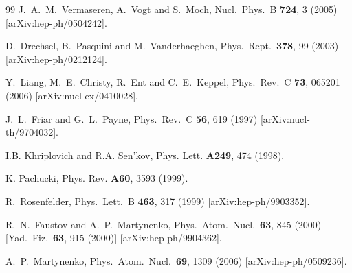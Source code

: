 \documentclass[a4paper,12pt]{article}
\begin{document}
\begin{thebibliography}{99}
  J.~A.~M.~Vermaseren, A.~Vogt and S.~Moch,
  Nucl.\ Phys.\  B {\bf 724}, 3 (2005)
  [arXiv:hep-ph/0504242].

  D.~Drechsel, B.~Pasquini and M.~Vanderhaeghen,
  Phys.\ Rept.\  {\bf 378}, 99 (2003)
  [arXiv:hep-ph/0212124].
  
  Y.~Liang, M.~E.~Christy, R.~Ent and C.~E.~Keppel,
  Phys.\ Rev.\  C {\bf 73}, 065201 (2006)
  [arXiv:nucl-ex/0410028].
  
J.~L.~Friar and G.~L.~Payne,
Phys.\ Rev.\ C {\bf 56}, 619 (1997)
[arXiv:nucl-th/9704032].

 I.B. Khriplovich and R.A. Sen'kov, Phys. Lett. {\bf A249}, 474 (1998). 

 K. Pachucki, Phys. Rev. {\bf A60}, 3593 (1999).

  R.~Rosenfelder,
  Phys.\ Lett.\  B {\bf 463}, 317 (1999)
  [arXiv:hep-ph/9903352].

  R.~N.~Faustov and A.~P.~Martynenko,
  Phys.\ Atom.\ Nucl.\  {\bf 63}, 845 (2000)
  [Yad.\ Fiz.\  {\bf 63}, 915 (2000)]
  [arXiv:hep-ph/9904362].


  A.~P.~Martynenko,
  Phys.\ Atom.\ Nucl.\  {\bf 69}, 1309 (2006)
  [arXiv:hep-ph/0509236].

\end{thebibliography}
\end{document}
